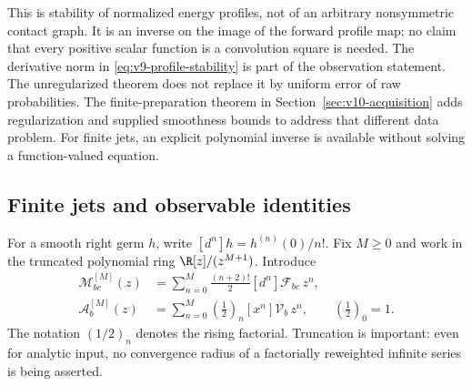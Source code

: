 This is stability of normalized energy profiles, not of an arbitrary
nonsymmetric contact graph. It is an inverse on the image of the
forward profile map; no claim that every positive scalar function is
a convolution square is needed. The derivative norm in
\eqref{eq:v9-profile-stability} is part of the observation statement.
The unregularized theorem does not replace it by uniform error of raw
probabilities. The finite-preparation theorem in
Section~\ref{sec:v10-acquisition} adds regularization and supplied
smoothness bounds to address that different data problem. For finite
jets, an explicit polynomial
inverse is available without solving a function-valued equation.

\subsection{Finite jets and observable identities}
For a smooth right germ $h$, write $[d^n]h=h^{(n)}(0)/n!$.
Fix $M\ge0$ and work in the truncated polynomial ring
$\R[z]/(z^{M+1})$. Introduce
\begin{equation}\label{eq:v9-jet-transform}
 \begin{split}
 \mathcal M_{bc}^{[M]}(z)
   &=\sum_{n=0}^M\frac{(n+2)!}{2}[d^n]\mathcal F_{bc}\,z^n,\\
 \mathcal A_b^{[M]}(z)
   &=\sum_{n=0}^M (\tfrac12)_n[x^n]\mathcal V_b\,z^n,
 \qquad (\tfrac12)_0=1.
 \end{split}
\end{equation}
The notation $(1/2)_n$ denotes the rising factorial. Truncation is
important: even for analytic input, no convergence radius of a
factorially reweighted infinite series is being asserted.

